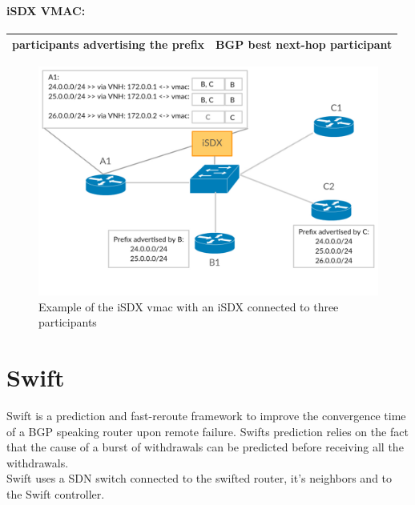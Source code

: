 \paragraph{\label{chapter2:iSDX:virtual next-hop :inbound policies}iSDX VMAC:}

\begin{tabular}{|r|l|}
  \hline 
  participants advertising the prefix & BGP best next-hop participant \\
  \hline
\end{tabular}

\begin{figure}[h]
\includegraphics[scale = 0.36]{Figures/intro_sdx_vmac.pdf}
\caption{Example of the iSDX vmac with an iSDX connected to three participants}
\label{fig:isdx_vmac}
\end{figure}

\section{\label{chapter2:Swift}Swift}


Swift is a prediction and fast-reroute framework to improve the convergence time of a BGP speaking router upon remote failure. Swifts prediction relies on the fact that the cause of a burst of withdrawals can be predicted before receiving all the withdrawals. \\ Swift uses a SDN switch connected to the swifted router, it's neighbors and to the Swift controller. 


